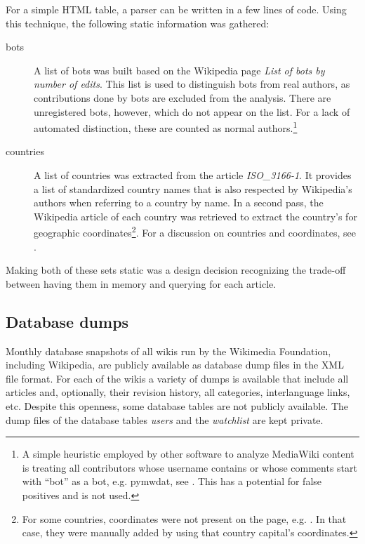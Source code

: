 For a simple \ac{HTML} table, a parser can be written in a few lines of code.
Using this technique, the following static information was gathered:

\begin{description}
\item[bots] A list of bots was built based on the Wikipedia page \emph{List of bots by number of edits}. 
This list is used to distinguish bots from real authors, as contributions done by bots are excluded from the analysis.
There are unregistered bots, however, which do not appear on the list.
For a lack of automated distinction, these are counted as normal authors.\footnote{A simple heuristic employed by other software to analyze MediaWiki content is treating all contributors whose username contains or whose comments start with ``bot'' as a bot, e.g. pymwdat, see . This has a potential for false positives and is not used.}
\item[countries] A list of countries was extracted from the article \emph{ISO\_3166-1}. 
It provides a list of standardized country names that is also respected by Wikipedia's authors when referring to a country by name.
In a second pass, the Wikipedia article of each country was retrieved to extract the country's for geographic coordinates\footnote{For some countries, coordinates were not present on the page, e.g. . In that case, they were manually added by using that country capital's coordinates.}.
For a discussion on countries and coordinates, see .
\end{description}

Making both of these sets static was a design decision recognizing the trade-off between having them in memory and querying for each article.

\subsection{Database dumps}\label{sub:dumps}

Monthly database snapshots of all wikis run by the Wikimedia Foundation, including Wikipedia,  are publicly available as database dump files in the \ac{XML} file format.
For each of the wikis a variety of dumps is available that include all articles and, optionally, their revision history, all categories, interlanguage links, etc.
Despite this openness, some database tables are not publicly available.
The dump files of the database tables \emph{users} and the \emph{watchlist} are kept private.

